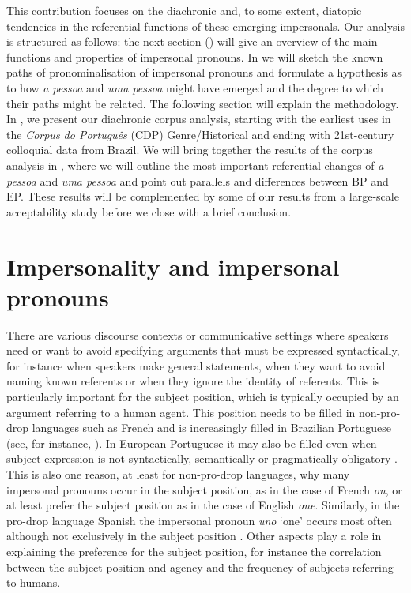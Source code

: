 \documentclass[output=paper]{langscibook}
\begin{document}
{This contribution focuses on the diachronic and, to some extent, diatopic tendencies in the referential functions of these emerging impersonals. Our analysis is structured as follows: the next section () will give an overview of the main functions and properties of impersonal pronouns. In  we will sketch the known paths of pronominalisation of impersonal pronouns and formulate a hypothesis as to how} {\textit{a pessoa} }{and} {\textit{uma pessoa}} {might have emerged and the degree to which their paths might be related. The following section  will explain the methodology. In , we present our diachronic corpus analysis, starting with the earliest uses in the} {\textit{Corpus do Português}} (CDP) {Genre/Historical and ending with 21st{}-century colloquial data from Brazil. We will bring together the results of the corpus analysis in , where we will outline the most important referential changes of} {\textit{a pessoa}} {and} {\textit{uma pessoa}} {and point out parallels and differences between BP and EP. These results will be complemented by some of our results from a large-scale acceptability study before we close with a brief conclusion.} 



\section{Impersonality and impersonal pronouns}\label{sec:amaral:2}



{There are various discourse contexts or communicative settings where speakers need or want to avoid specifying arguments that must be expressed syntactically, for instance when speakers make general} {statements, when they want to avoid naming known referents or when they ignore the identity of referents. This is particularly important for the subject position, which is typically occupied by an argument referring to a human agent. This position needs to be filled in non{}-pro-drop languages such as French and is increasingly filled in Brazilian Portuguese (see, for instance, \citealt{Kato2000}). In European Portuguese it may also be filled even when subject expression is not syntactically, semantically or pragmatically obligatory \citep[346]{Posio2012}. This is also one reason, at least for non-pro-drop languages, why many impersonal pronouns occur in the subject position, as in the case of French} {\textit{on}}{, or at least prefer the subject position as in the case of English} \textit{one}. Similarly, in the pro-drop language Spanish the impersonal pronoun \textit{uno} ‘one’ occurs most often although not exclusively in the subject position \parencites[43--44]{CabredoHofherr2008}[263]{CabredoHofherr2017}. Other aspects play a role in explaining the preference for the subject position, for instance the correlation between the subject position and agency and the frequency of subjects referring to humans.
\end{document}
